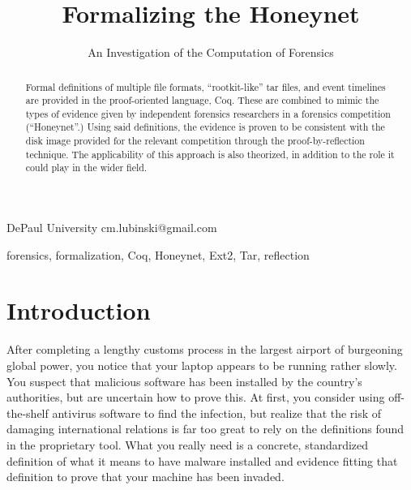 \documentclass[nocopyrightspace]{sigplanconf}
\begin{document}
\lstset{language=coq, basicstyle=\ttfamily\scriptsize, columns=flexible,
keepspaces=true}

\setlength{\pdfpageheight}{\paperheight}
\setlength{\pdfpagewidth}{\paperwidth}



\title{Formalizing the Honeynet}
\subtitle{An Investigation of the Computation of Forensics}

           {DePaul University}
           {cm.lubinski@gmail.com}

\maketitle

\begin{abstract}
Formal definitions of multiple file formats, ``rootkit-like'' tar files, and
event timelines are provided in the proof-oriented language, Coq. These are
combined to mimic the types of evidence given by independent forensics
researchers in a forensics competition (``Honeynet''.) Using said definitions,
the evidence is proven to be consistent with the disk image provided for the
relevant competition through the proof-by-reflection technique. The
applicability of this approach is also theorized, in addition to the role it
could play in the wider field.
\end{abstract}

\keywords
forensics, formalization, Coq, Honeynet, Ext2, Tar, reflection

\section{Introduction}

After completing a lengthy customs process in the largest airport of
burgeoning global power, you notice that your laptop appears to be running
rather slowly. You suspect that malicious software has been installed by the
country's authorities, but are uncertain how to prove this. At first, you
consider using off-the-shelf antivirus software to find the infection, but
realize that the risk of damaging international relations is far too great to
rely on the definitions found in the proprietary tool. What you really need
is a concrete, standardized definition of what it means to have malware
installed and evidence fitting that definition to prove that your machine has
been invaded.
\end{document}
